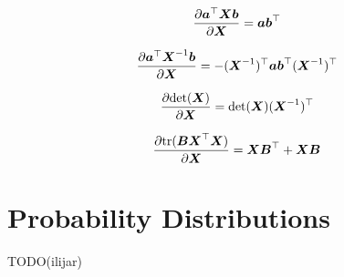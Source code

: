 \documentclass{article}
\begin{document}
\begin{align}
  \frac{\partial \vec a\T \mat X \vec b}{\partial \mat X}
    = \vec a \vec b\T
\end{align}

\begin{align}
  \frac{\partial \vec a\T \mat X\inv \vec b}{\partial \mat X}
    = - (\mat X\inv)\T \vec a \vec b\T (\mat X\inv)\T
\end{align}

\begin{align}
  \frac{\partial \determ{\mat X}}{\partial \mat X}
    = \determ{\mat X} (\mat X\inv)\T
\end{align}

\begin{align}
  \frac{\partial \tr{\mat B \mat X\T \mat X}}{\partial \mat X}
    = \mat X \mat B\T + \mat X \mat B
\end{align}

\newpage
\section{Probability Distributions}
TODO(ilijar)
\end{document}
